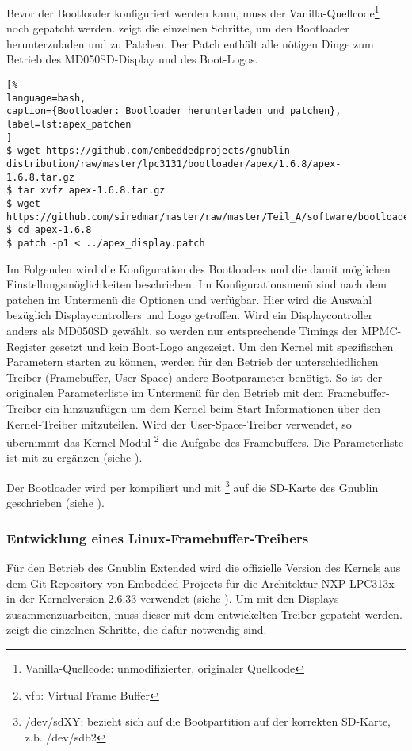 Bevor der Bootloader konfiguriert werden kann, muss der Vanilla-Quellcode\footnote{Vanilla-Quellcode: unmodifizierter, originaler Quellcode} noch gepatcht werden.  zeigt die einzelnen Schritte, um den Bootloader herunterzuladen und zu Patchen. Der Patch enthält alle nötigen Dinge zum Betrieb des MD050SD-Display und des Boot-Logos.

\begin{lstlisting}[%
language=bash,
caption={Bootloader: Bootloader herunterladen und patchen},
label=lst:apex_patchen
]
$ wget https://github.com/embeddedprojects/gnublin-distribution/raw/master/lpc3131/bootloader/apex/1.6.8/apex-1.6.8.tar.gz
$ tar xvfz apex-1.6.8.tar.gz
$ wget https://github.com/siredmar/master/raw/master/Teil_A/software/bootloader/apex_display.patch
$ cd apex-1.6.8
$ patch -p1 < ../apex_display.patch
\end{lstlisting}

Im Folgenden wird die Konfiguration des Bootloaders und die damit möglichen Einstellungsmöglichkeiten beschrieben. Im Konfigurationsmenü sind nach dem patchen im Untermenü  die Optionen  und  verfügbar. Hier wird die Auswahl bezüglich Displaycontrollers und Logo getroffen. Wird ein Displaycontroller anders als MD050SD gewählt, so werden nur entsprechende Timings der MPMC-Register gesetzt und kein Boot-Logo angezeigt. 
Um den Kernel mit spezifischen Parametern starten zu können, werden für den Betrieb der unterschiedlichen Treiber (Framebuffer, User-Space) andere Bootparameter benötigt. So ist der originalen Parameterliste  im Untermenü  für den Betrieb mit dem Framebuffer-Treiber ein  hinzuzufügen um dem Kernel beim Start Informationen über den Kernel-Treiber  mitzuteilen. Wird der User-Space-Treiber verwendet, so übernimmt das Kernel-Modul \footnote{vfb: Virtual Frame Buffer} die Aufgabe des Framebuffers. Die Parameterliste ist mit  zu ergänzen (siehe \cite{LinuxKernelFBCON}).

Der Bootloader wird per  kompiliert und mit  \footnote{/dev/sdXY: bezieht sich auf die Bootpartition auf der korrekten SD-Karte, z.b. /dev/sdb2} auf die SD-Karte des Gnublin geschrieben (siehe \cite{GnublinWiki2013a}).

\subsubsection{Entwicklung eines Linux-Framebuffer-Treibers}
Für den Betrieb des Gnublin Extended wird die offizielle Version des Kernels aus dem Git-Repository von Embedded Projects für die Architektur NXP LPC313x in der Kernelversion 2.6.33 verwendet (siehe \cite{GnublinWiki2013b}). Um mit den Displays zusammenzuarbeiten, muss dieser mit dem entwickelten Treiber gepatcht werden.  zeigt die einzelnen Schritte, die dafür notwendig sind.

